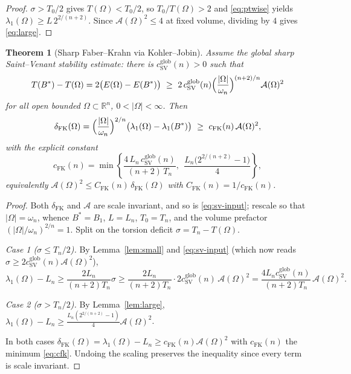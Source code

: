 \documentclass[11pt]{amsart}
\newtheorem{theorem}{Theorem}[section]
\theoremstyle{definition}
\newcommand{\R}{\mathbb R}
\newcommand{\Om}{\Omega}
\newcommand{\Fr}{\mathcal A}
\newcommand{\abs}[1]{\left|#1\right|}
\begin{document}
\begin{proof}
$\sigma>T_0/2$ gives $T(\Om)<T_0/2$, so $T_0/T(\Om)>2$ and
\eqref{eq:ptwise} yields $\lambda_1(\Om)\ge L\,2^{2/(n+2)}$. Since
$\Fr(\Om)^2\le4$ at fixed volume, dividing by $4$ gives \eqref{eq:large}.
\end{proof}

\begin{theorem}[Sharp Faber--Krahn via Kohler--Jobin]\label{thm:fk}
Assume the global sharp Saint--Venant stability estimate: there is
$c_{\mathrm{SV}}^{\mathrm{glob}}(n)>0$ such that
\begin{equation}\label{eq:sv-input}
  T(B^*)-T(\Om)=2\bigl(E(\Om)-E(B^*)\bigr)
  \ \ge\ 2\,c_{\mathrm{SV}}^{\mathrm{glob}}(n)
  \Bigl(\frac{\abs\Om}{\omega_n}\Bigr)^{(n+2)/n}\Fr(\Om)^2
\end{equation}
for all open bounded $\Om\subset\R^n$, $0<\abs\Om<\infty$. Then
\begin{equation}\label{eq:fk-out}
  \delta_{\mathrm{FK}}(\Om)
  =\Bigl(\frac{\abs\Om}{\omega_n}\Bigr)^{2/n}
   \bigl(\lambda_1(\Om)-\lambda_1(B^*)\bigr)
  \ \ge\ c_{\mathrm{FK}}(n)\,\Fr(\Om)^2,
\end{equation}
with the explicit constant
\begin{equation}\label{eq:cfk}
  c_{\mathrm{FK}}(n)=\min\!\left\{
  \frac{4\,L_n\,c_{\mathrm{SV}}^{\mathrm{glob}}(n)}{(n+2)\,T_n},\ \
  \frac{L_n\bigl(2^{2/(n+2)}-1\bigr)}{4}\right\},
\end{equation}
equivalently $\Fr(\Om)^2\le C_{\mathrm{FK}}(n)\,\delta_{\mathrm{FK}}(\Om)$
with $C_{\mathrm{FK}}(n)=1/c_{\mathrm{FK}}(n)$.
\end{theorem}

\begin{proof}
Both $\delta_{\mathrm{FK}}$ and $\Fr$ are scale invariant, and so is
\eqref{eq:sv-input}; rescale so that $\abs\Om=\omega_n$, whence $B^*=B_1$,
$L=L_n$, $T_0=T_n$, and the volume prefactor $(\abs\Om/\omega_n)^{2/n}=1$.
Split on the torsion deficit $\sigma=T_n-T(\Om)$.

\emph{Case 1 ($\sigma\le T_n/2$).} By Lemma~\ref{lem:small} and
\eqref{eq:sv-input} (which now reads
$\sigma\ge 2c_{\mathrm{SV}}^{\mathrm{glob}}(n)\Fr(\Om)^2$),
\[
  \lambda_1(\Om)-L_n
  \ge\frac{2L_n}{(n+2)T_n}\sigma
  \ge\frac{2L_n}{(n+2)T_n}\cdot 2c_{\mathrm{SV}}^{\mathrm{glob}}(n)\,\Fr(\Om)^2
  =\frac{4L_n c_{\mathrm{SV}}^{\mathrm{glob}}(n)}{(n+2)T_n}\,\Fr(\Om)^2 .
\]

\emph{Case 2 ($\sigma>T_n/2$).} By Lemma~\ref{lem:large},
$\lambda_1(\Om)-L_n\ge\frac{L_n(2^{2/(n+2)}-1)}{4}\Fr(\Om)^2$.

In both cases $\delta_{\mathrm{FK}}(\Om)=\lambda_1(\Om)-L_n\ge
c_{\mathrm{FK}}(n)\Fr(\Om)^2$ with $c_{\mathrm{FK}}(n)$ the minimum
\eqref{eq:cfk}. Undoing the scaling preserves the inequality since every
term is scale invariant.
\end{proof}
\end{document}

